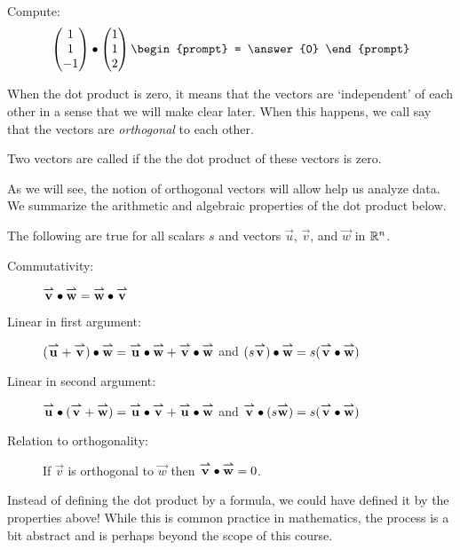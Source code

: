 \documentclass{ximera}
\begin{document}
\begin{question}
  Compute:
  \[
  \begin{pmatrix}1\\1\\-1\end{pmatrix}\dotp\begin{pmatrix}1\\1\\2\end{pmatrix}
  \begin{prompt}
    = \answer{0}
  \end{prompt}
  \]
\end{question}
When the dot product is zero, it means that the vectors are
`independent' of each other in a sense that we will make clear
later. When this happens, we call say that the vectors are
\textit{orthogonal} to each other.

\begin{definition}
  Two vectors are called  if the the dot product of
  these vectors is zero.
\end{definition}


As we will see, the notion of orthogonal vectors will allow help us analyze data.
We summarize the arithmetic and algebraic properties of the dot
product below.
\begin{theorem}
  The following are true for all scalars $s$ and vectors
  $\vec{u}$, $\vec{v}$, and $\vec{w}$ in $\R^n$.
  \begin{description}
  \item[Commutativity:] $\vec{v} \dotp \vec{w} = \vec{w} \dotp
    \vec{v}$
  \item[Linear in first argument:] $(\vec{u}+\vec{v})\dotp \vec{w} = \vec{u}\dotp \vec{w} +
    \vec{v}\dotp \vec{w}$ and $(s\vec{v})\dotp \vec{w} = s(\vec{v}
    \dotp \vec{w})$
  \item[Linear in second argument:] $\vec{u} \dotp (\vec{v}+\vec{w}) = \vec{u}\dotp \vec{v}+
    \vec{u}\dotp \vec{w}$ and $\vec{v} \dotp (s\vec{w}) = s(\vec{v}
    \dotp \vec{w})$
  \item[Relation to orthogonality:] If $\vec{v}$ is orthogonal to
    $\vec{w}$ then $\vec{v} \dotp \vec{w} = 0$.
  \end{description}
\end{theorem}
 
Instead of defining the dot product by a formula, we could have
defined it by the properties above!  While this is common practice in
mathematics, the process is a bit abstract and is perhaps beyond the
scope of this course.
\end{document}
